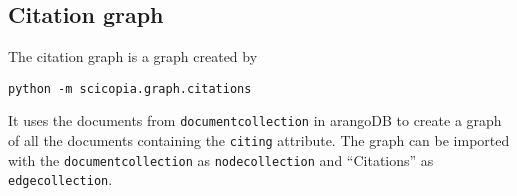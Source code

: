 \subsection{Citation graph}
The citation graph is a graph created by 
\begin{verbatim}
python -m scicopia.graph.citations
\end{verbatim}
It uses the documents from \texttt{documentcollection} in arangoDB to create a graph of all the documents containing the \texttt{citing} attribute. The graph can be imported with the \texttt{documentcollection} as \texttt{nodecollection} and ``Citations'' as \texttt{edgecollection}.